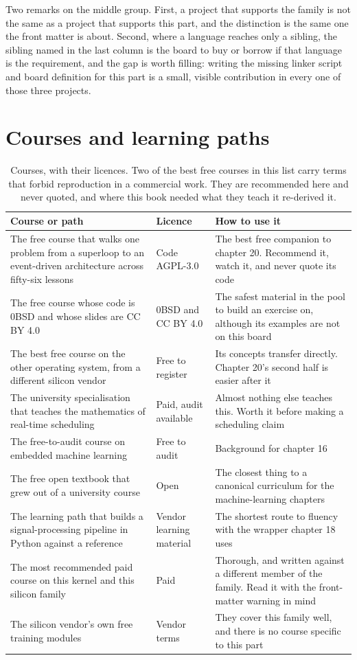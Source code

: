 Two remarks on the middle group. First, a project that supports the family is
not the same as a project that supports this part, and the distinction is the
same one the front matter is about. Second, where a language reaches only a
sibling, the sibling named in the last column is the board to buy or borrow if
that language is the requirement, and the gap is worth filling: writing the
missing linker script and board definition for this part is a small, visible
contribution in every one of those three projects.

\section{Courses and learning paths}

\begin{table}[H]\centering\small
\begin{tabular}{p{62mm}p{44mm}p{46mm}}
\toprule
Course or path & Licence & How to use it \\
\midrule
The free course that walks one problem from a superloop to an event-driven architecture across fifty-six lessons & Code AGPL-3.0 & The best free companion to chapter 20. Recommend it, watch it, and never quote its code \\
The free course whose code is 0BSD and whose slides are CC BY 4.0 & 0BSD and CC BY 4.0 & The safest material in the pool to build an exercise on, although its examples are not on this board \\
The best free course on the other operating system, from a different silicon vendor & Free to register & Its concepts transfer directly. Chapter 20's second half is easier after it \\
The university specialisation that teaches the mathematics of real-time scheduling & Paid, audit available & Almost nothing else teaches this. Worth it before making a scheduling claim \\
The free-to-audit course on embedded machine learning & Free to audit & Background for chapter 16 \\
The free open textbook that grew out of a university course & Open & The closest thing to a canonical curriculum for the machine-learning chapters \\
The learning path that builds a signal-processing pipeline in Python against a reference & Vendor learning material & The shortest route to fluency with the wrapper chapter 18 uses \\
The most recommended paid course on this kernel and this silicon family & Paid & Thorough, and written against a different member of the family. Read it with the front-matter warning in mind \\
The silicon vendor's own free training modules & Vendor terms & They cover this family well, and there is no course specific to this part \\
\bottomrule
\end{tabular}
\caption{Courses, with their licences. Two of the best free courses in this list carry terms that forbid reproduction in a commercial work. They are recommended here and never quoted, and where this book needed what they teach it re-derived it.}
\end{table}

